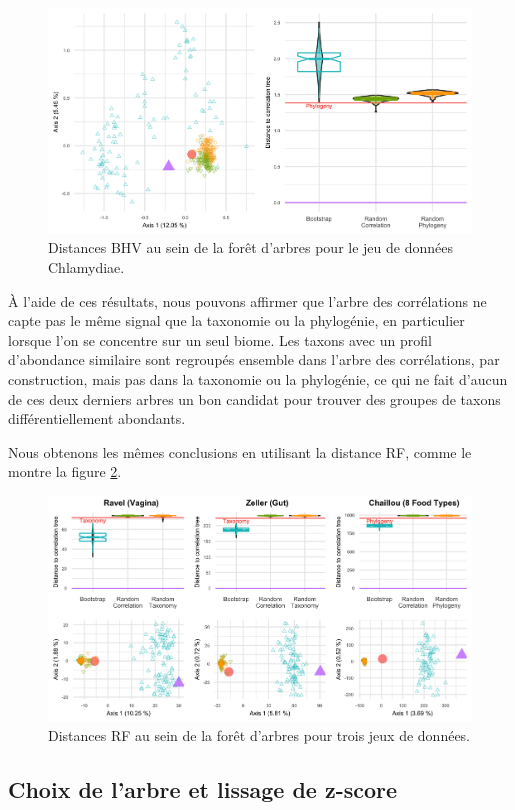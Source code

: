 \documentclass[12pt,a4paper]{reedthesis}
\theoremstyle{definition}
\theoremstyle{definition}
\theoremstyle{definition}
\theoremstyle{remark}
\begin{document}
\begin{figure}[t]

{\centering \includegraphics[width=0.9\linewidth]{img/foretbhv_ch} 

}

\caption{Distances BHV au sein de la forêt d'arbres pour le jeu de données Chlamydiae.}\label{fig:foretbhvbis}
\end{figure}
À l'aide de ces résultats, nous pouvons affirmer que l'arbre des corrélations ne capte pas le même signal que la taxonomie ou la phylogénie, en particulier lorsque l'on se concentre sur un seul biome. Les taxons avec un profil d'abondance similaire sont regroupés ensemble dans l'arbre des corrélations, par construction, mais pas dans la taxonomie ou la phylogénie, ce qui ne fait d'aucun de ces deux derniers arbres un bon candidat pour trouver des groupes de taxons différentiellement abondants.

Nous obtenons les mêmes conclusions en utilisant la distance RF, comme le montre la figure \ref{fig:foretrf}.


\begin{figure}

{\centering \includegraphics[width=0.9\linewidth]{img/foretrf} 

}

\caption{Distances RF au sein de la forêt d'arbres pour trois jeux de données.}\label{fig:foretrf}
\end{figure}
\hypertarget{checktreefdr}{%
\subsection{Choix de l'arbre et lissage de z-score}\label{checktreefdr}}
\end{document}
